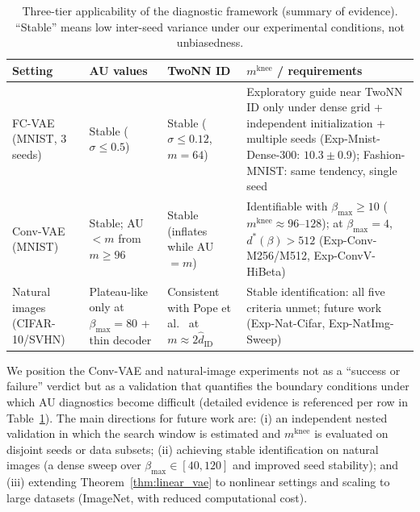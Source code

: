 \documentclass[make,article,submit,pdftex,moreauthors]{Definitions/mdpi}
\newcommand{\mknee}{m^{\mathrm{knee}}}
\begin{document}
\begin{table}[H]
\centering
\caption{Three-tier applicability of the diagnostic framework (summary of evidence). ``Stable'' means low inter-seed variance under our experimental conditions, not unbiasedness.}
\label{tab:applicability}
\small
\begin{tabularx}{\textwidth}{p{2.6cm}XXX}
\toprule
\textbf{Setting} & \textbf{AU values} & \textbf{TwoNN ID} & \textbf{$\mknee$ / requirements} \\
\midrule
FC-VAE (MNIST, 3 seeds) & Stable ($\sigma \leq 0.5$) & Stable ($\sigma \leq 0.12$, $m=64$) &
Exploratory guide near TwoNN ID only under dense grid + independent initialization + multiple seeds
(Exp-Mnist-Dense-300: $10.3 \pm 0.9$); Fashion-MNIST: same tendency, single seed \\
\addlinespace
Conv-VAE (MNIST) & Stable; AU$<m$ from $m \geq 96$ & Stable (inflates while AU$=m$) &
Identifiable with $\beta_{\max} \geq 10$ ($\mknee \approx 96$--$128$); at $\beta_{\max}=4$, $d^*(\beta) > 512$
(Exp-Conv-M256/M512, Exp-ConvV-HiBeta) \\
\addlinespace
Natural images (CIFAR-10/SVHN) & Plateau-like only at $\beta_{\max}=80$ + thin decoder &
Consistent with Pope et al.~\cite{pope2021intrinsic} at $m \approx 2\hat{d}_\mathrm{ID}$ &
Stable identification: all five criteria unmet; future work
(Exp-Nat-Cifar, Exp-NatImg-Sweep) \\
\bottomrule
\end{tabularx}
\end{table}

We position the Conv-VAE and natural-image experiments not as a
``success or failure'' verdict but as a validation that quantifies the
boundary conditions under which AU diagnostics become difficult
(detailed evidence is referenced per row in Table~\ref{tab:applicability}).
The main directions for future work are:
(i) an independent nested validation in which the search window is estimated
and $\mknee$ is evaluated on disjoint seeds or data subsets;
(ii) achieving stable identification on natural images (a dense sweep over
$\beta_{\max} \in [40,120]$ and improved seed stability); and
(iii) extending Theorem~\ref{thm:linear_vae} to nonlinear settings and scaling
to large datasets (ImageNet, with reduced computational cost).


\end{document}
